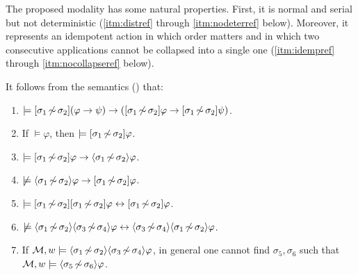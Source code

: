 \begin{textonuevo}
The proposed modality has some natural properties. First, it is normal and serial but not deterministic (\ref{itm:distref} through \ref{itm:nodeterref} below). Moreover, it represents an idempotent action in which order matters and in which two consecutive applications cannot be collapsed into a single one (\ref{itm:idempref} through \ref{itm:nocollapseref} below). 

\medskip

\begin{proposition}\label{prop:ref-normal-serial}
It follows from the semantics () that:
\begin{enumerate}
\item\label{itm:distref} $\models [{\sigma_1{\,\not\sim\,}\sigma_2}](\varphi \rightarrow \psi) \rightarrow ([{\sigma_1{\,\not\sim\,}\sigma_2}]\varphi \rightarrow
[{\sigma_1{\,\not\sim\,}\sigma_2}]\psi)$.
\item\label{itm:necessitationref} If $\models \varphi$, then $\models [{\sigma_1{\,\not\sim\,}\sigma_2}]\varphi$.
\item\label{itm:serialityref}  $\models [{\sigma_1{\,\not\sim\,}\sigma_2}]\varphi \rightarrow \langle \sigma_1{\,\not\sim\,}\sigma_2 \rangle\varphi$.

\item\label{itm:nodeterref}  $\not\models \langle \sigma_1{\,\not\sim\,}\sigma_2 \rangle\varphi \rightarrow [{\sigma_1{\,\not\sim\,}\sigma_2}]\varphi$.

\item\label{itm:idempref} $\models [{\sigma_1{\,\not\sim\,}\sigma_2}][{\sigma_1{\,\not\sim\,}\sigma_2}]\varphi \leftrightarrow [{\sigma_1{\,\not\sim\,}\sigma_2}]\varphi$.
\item\label{itm:commref} $\not\models \langle \sigma_1{\,\not\sim\,}\sigma_2 \rangle\langle \sigma_3{\,\not\sim\,}\sigma_4 \rangle\varphi \leftrightarrow \langle \sigma_3{\,\not\sim\,}\sigma_4 \rangle\langle \sigma_1{\,\not\sim\,}\sigma_2 \rangle\varphi$.
\item\label{itm:nocollapseref} If $\mathcal{M},w \models \langle \sigma_1{\,\not\sim\,}\sigma_2 \rangle\langle \sigma_3{\,\not\sim\,}\sigma_4 \rangle\varphi$, in general one cannot find $\sigma_5, \sigma_6$ such that $\mathcal{M},w \models \langle \sigma_5{\,\not\sim\,}\sigma_6 \rangle\varphi$.
\end{enumerate}
\end{proposition}


\end{textonuevo}
